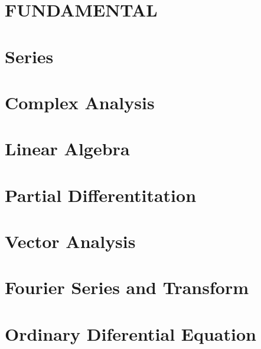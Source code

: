 \documentclass[10pt]{article}
\theoremstyle{definition}
\begin{document}
\pagestyle{empty}
\nocite{*}

\clearpage
\section{FUNDAMENTAL}
\thispagestyle{empty}

\clearpage
\section{Series}

\clearpage

\section{Complex Analysis}

\clearpage

\clearpage

\section{Linear Algebra}

\clearpage

\clearpage

\section{Partial Differentitation}

\clearpage

\clearpage

\section{Vector Analysis}

\clearpage

\section{Fourier Series and Transform}

\clearpage

\section{Ordinary Diferential Equation}

\clearpage

\clearpage

\clearpage

\clearpage
\end{document}
